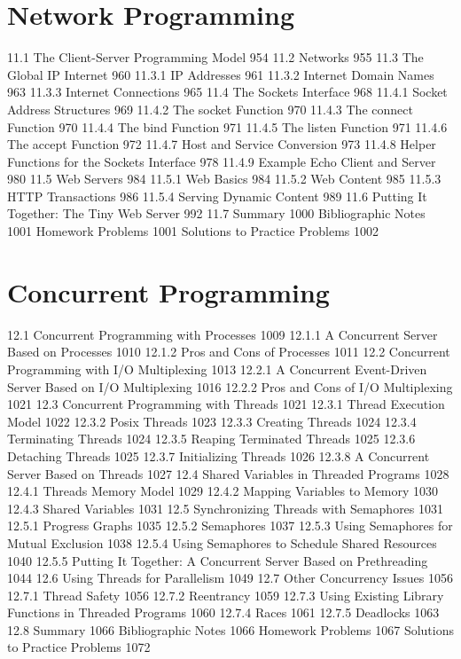 \section{Network Programming}
11.1 The Client-Server Programming Model 954
11.2 Networks 955
11.3 The Global IP Internet 960
11.3.1 IP Addresses 961
11.3.2 Internet Domain Names 963
11.3.3 Internet Connections 965
11.4 The Sockets Interface 968
11.4.1 Socket Address Structures 969
11.4.2 The socket Function 970
11.4.3 The connect Function 970
11.4.4 The bind Function 971
11.4.5 The listen Function 971
11.4.6 The accept Function 972
11.4.7 Host and Service Conversion 973
11.4.8 Helper Functions for the Sockets Interface 978
11.4.9 Example Echo Client and Server 980
11.5 Web Servers 984
11.5.1 Web Basics 984
11.5.2 Web Content 985
11.5.3 HTTP Transactions 986
11.5.4 Serving Dynamic Content 989
11.6 Putting It Together: The Tiny Web Server 992
11.7 Summary 1000
Bibliographic Notes 1001
Homework Problems 1001
Solutions to Practice Problems 1002

\section{Concurrent Programming}
12.1 Concurrent Programming with Processes 1009
12.1.1 A Concurrent Server Based on Processes 1010
12.1.2 Pros and Cons of Processes 1011
12.2 Concurrent Programming with I/O Multiplexing 1013
12.2.1 A Concurrent Event-Driven Server Based on I/O
Multiplexing 1016
12.2.2 Pros and Cons of I/O Multiplexing 1021
12.3 Concurrent Programming with Threads 1021
12.3.1 Thread Execution Model 1022
12.3.2 Posix Threads 1023
12.3.3 Creating Threads 1024
12.3.4 Terminating Threads 1024
12.3.5 Reaping Terminated Threads 1025
12.3.6 Detaching Threads 1025
12.3.7 Initializing Threads 1026
12.3.8 A Concurrent Server Based on Threads 1027
12.4 Shared Variables in Threaded Programs 1028
12.4.1 Threads Memory Model 1029
12.4.2 Mapping Variables to Memory 1030
12.4.3 Shared Variables 1031
12.5 Synchronizing Threads with Semaphores 1031
12.5.1 Progress Graphs 1035
12.5.2 Semaphores 1037
12.5.3 Using Semaphores for Mutual Exclusion 1038
12.5.4 Using Semaphores to Schedule Shared Resources 1040
12.5.5 Putting It Together: A Concurrent Server Based on
Prethreading 1044
12.6 Using Threads for Parallelism 1049
12.7 Other Concurrency Issues 1056
12.7.1 Thread Safety 1056
12.7.2 Reentrancy 1059
12.7.3 Using Existing Library Functions in Threaded Programs 1060
12.7.4 Races 1061
12.7.5 Deadlocks 1063
12.8 Summary 1066
Bibliographic Notes 1066
Homework Problems 1067
Solutions to Practice Problems 1072
